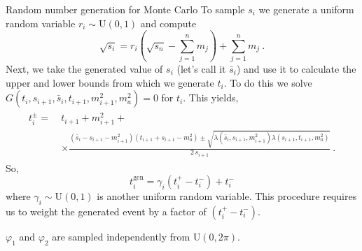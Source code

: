 \newpage
\begin{bluenv}{Random number generation for Monte Carlo}
    To sample $s_i$ we generate a uniform random variable $r_i \sim \mathrm{U}(0,1)$ and compute
    \begin{equation}
        \sqrt{s_i} = r_i \left(\sqrt{s_n} - \sum_{j=1}^{n} m_j\right) + \sum_{j=1}^{n} m_j\ .
    \end{equation}
    Next, we take the generated value of $s_i$ (let's call it $\bar{s}_{i}$) and use it to calculate the upper and lower bounds from which we generate $t_i$.
    \newline To do this we solve
    $G(t_{i}, s_{i+1}, \bar{s}_{i}, t_{i+1}, m_{i+1}^2, m_a^2) = 0$ for $t_{i}$. 
    This yields,
    \begin{gather}
        \begin{aligned}
            t_{i}^{\pm} 
            =\ 
            &t_{i+1} + m_{i+1}^2 + \\
            & \times 
            \frac{
                (\bar{s}_{i} - s_{i+1} - m_{i+1}^2)(t_{i+1} + s_{i+1} - m_a^2) \pm \sqrt{\lambda(\bar{s}_{i}, s_{i+1}, m_{i+1}^2)\lambda(s_{i+1},t_{i+1},m_a^2)}
            }
            {2\,s_{i+1}} \ .
        \end{aligned} 
    \end{gather}
    So,
    \begin{equation}
        t_i^{\mathrm{gen}} = \gamma_i (t_i^+ - t_i^-) + t_i^-
    \end{equation}
    where $\gamma_i \sim \mathrm{U}(0,1)$ is another uniform random variable. 
    This procedure requires us to weight the generated event by a factor of $(t_i^{+} - t_i^{-})$.

    $\varphi_1$ and $\varphi_2$ are sampled independently from $\mathrm{U}(0,2\pi)$.
\end{bluenv}
